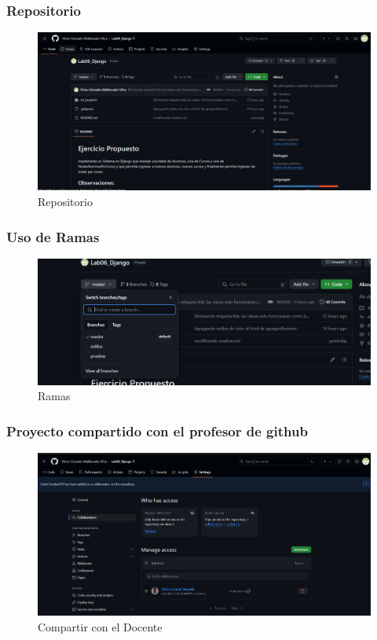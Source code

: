 \documentclass{article}
\begin{document}

	\subsubsection{Repositorio}
  \begin{figure}[H]
    \centering
    \includegraphics[width=1\textwidth, keepaspectratio]{img/repositorio.png}
    \caption{Repositorio}
  \end{figure}
  
  
\subsubsection{Uso de Ramas}
  \begin{figure}[H]
    \centering
    \includegraphics[width=1\textwidth, keepaspectratio]{img/ramas.png}
    \caption{Ramas}
  \end{figure}
  

	\subsubsection{Proyecto compartido con el profesor de github}
  \begin{figure}[H]
    \centering
    \includegraphics[width=1\textwidth, keepaspectratio]{img/compartir.png}
    \caption{Compartir con el Docente}
  \end{figure}
  \newpage
  
\end{document}
